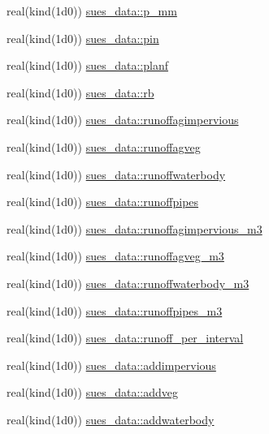 \begin{DoxyCompactItemize}
\item 
real(kind(1d0)) \hyperlink{namespacesues__data_a9ddcc1842e650815dfc06fa4a3bf6a78}{sues\+\_\+data\+::p\+\_\+mm}
\item 
real(kind(1d0)) \hyperlink{namespacesues__data_aa2d35158f50e5437170a36712c99a891}{sues\+\_\+data\+::pin}
\item 
real(kind(1d0)) \hyperlink{namespacesues__data_a0489c46c970c2dd6ecdf0af0e11dee21}{sues\+\_\+data\+::planf}
\item 
real(kind(1d0)) \hyperlink{namespacesues__data_a90293da57db1b1a3a4bc0979d2005640}{sues\+\_\+data\+::rb}
\item 
real(kind(1d0)) \hyperlink{namespacesues__data_ac376fe6389c7367c307fce12d816009c}{sues\+\_\+data\+::runoffagimpervious}
\item 
real(kind(1d0)) \hyperlink{namespacesues__data_ac2654954c97c2cbba667e51f44850250}{sues\+\_\+data\+::runoffagveg}
\item 
real(kind(1d0)) \hyperlink{namespacesues__data_a0fce415bc7210db0cfe37ded2d8c1ef5}{sues\+\_\+data\+::runoffwaterbody}
\item 
real(kind(1d0)) \hyperlink{namespacesues__data_a20b9d66de8207bb6709f620aebc98b17}{sues\+\_\+data\+::runoffpipes}
\item 
real(kind(1d0)) \hyperlink{namespacesues__data_a56bf7a98188b09dfcd2c9daed991f1b0}{sues\+\_\+data\+::runoffagimpervious\+\_\+m3}
\item 
real(kind(1d0)) \hyperlink{namespacesues__data_a030c38cf6a2cc1b2121491399a0353a5}{sues\+\_\+data\+::runoffagveg\+\_\+m3}
\item 
real(kind(1d0)) \hyperlink{namespacesues__data_abc5b5ae18f30abb3a858e2e24e1e99d7}{sues\+\_\+data\+::runoffwaterbody\+\_\+m3}
\item 
real(kind(1d0)) \hyperlink{namespacesues__data_ac5a856a3cdf4ba0b3a9150f2a08bb13d}{sues\+\_\+data\+::runoffpipes\+\_\+m3}
\item 
real(kind(1d0)) \hyperlink{namespacesues__data_a3e74512061da577d1697d50324b5ea28}{sues\+\_\+data\+::runoff\+\_\+per\+\_\+interval}
\item 
real(kind(1d0)) \hyperlink{namespacesues__data_af0fed458b1eefc0164c4ffb6d6e2d1a2}{sues\+\_\+data\+::addimpervious}
\item 
real(kind(1d0)) \hyperlink{namespacesues__data_a2553d0e5b7218422246f2078b379fed5}{sues\+\_\+data\+::addveg}
\item 
real(kind(1d0)) \hyperlink{namespacesues__data_aa314ccdf6d41a3901fa922504f030203}{sues\+\_\+data\+::addwaterbody}

\end{DoxyCompactItemize}
